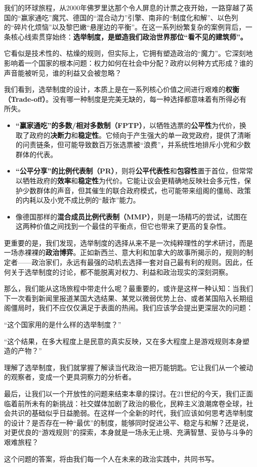 我们的环球旅程，从2000年佛罗里达那个令人屏息的计票之夜开始，一路穿越了英国的“赢家通吃”魔咒、德国的“混合动力”引擎、南非的“制度化和解”、以色列的“碎片化烦恼”以及黎巴嫩“悬崖边的平衡”。在这一系列纷繁复杂的案例背后，一条核心线索贯穿始终：\textbf{选举制度，是塑造我们政治世界那位“看不见的建筑师”。}

它看似是技术性的、枯燥的规则，但实际上，它拥有塑造政治的“魔力”。它深刻地影响着一个国家的根本问题：权力如何在社会中分配？政府以何种方式形成？谁的声音能被听见，谁的利益又会被忽略？

我们看到，选举制度的设计，本质上是在一系列核心价值之间进行艰难的\textbf{权衡（Trade-off）}。没有哪一种制度是完美无缺的，每一种选择都意味着有所得必有所失。

\begin{itemize}
    \item \textbf{“赢家通吃”的多数/相对多数制（FPTP）}，以牺牲选票的\textbf{公平性}为代价，换取了政府的\textbf{决断力}和\textbf{稳定性}。它倾向于产生强大的单一政党政府，提供了清晰的问责链条，但可能导致数百万张选票被“浪费”，并系统性地排斥小党和少数群体的代表。
    \item \textbf{“公平分享”的比例代表制（PR）}，则将\textbf{公平代表性}和\textbf{包容性}置于首位，但常常以牺牲政府的\textbf{效率}和\textbf{稳定性}为代价。它能让议会更精确地反映社会多元性，保护少数群体的声音，但其催生的联合政府模式，也可能带来组阁的僵局、政策的内耗以及小党不成比例的“敲诈”能力。
    \item 像德国那样的\textbf{混合成员比例代表制（MMP）}，则是一场精巧的尝试，试图在这两种价值之间找到一个最佳的平衡点，但它也带来了更高的复杂性。
\end{itemize}

更重要的是，我们发现，选举制度的选择从来不是一次纯粹理性的学术研讨，而是一场赤裸裸的\textbf{政治博弈}。正如新西兰、意大利和加拿大的故事所揭示的，规则的制定者——政治家们，永远有最强的动机去选择一套对自己最有利的规则。因此，任何关于选举制度的讨论，都不能脱离对权力、利益和政治现实的深刻洞察。

那么，我们能从这场旅程中带走什么呢？最重要的，或许是这样一种认知：当我们下一次看到新闻里报道某国大选结果、某党以微弱优势上台、或者某国陷入长期组阁僵局时，我们不应仅仅满足于表面的热闹。我们应该学会提出更深层次的问题：

“这个国家用的是什么样的选举制度？”

“这个结果，在多大程度上是民意的真实反映，又在多大程度上是游戏规则本身塑造的产物？”

理解了选举制度，我们就掌握了解读当代政治一把万能钥匙。它让我们从一个被动的观察者，变成一个更具洞察力的分析者。

最后，让我们以一个开放性的问题来结束本章的探讨。在21世纪的今天，我们正面临着前所未有的新挑战：社交媒体加剧了政治的极化，民粹主义浪潮席卷全球，社会共识的基础似乎日益脆弱。在这样一个全新的时代，我们应该如何思考选举制度的设计？是否存在一种“最优”的制度，能够同时促进公平、稳定与和解？还是说，对更优良的“游戏规则”的探索，本身就是一场永无止境、充满智慧、妥协与斗争的艰难旅程？

这个问题的答案，将由我们每一个人在未来的政治实践中，共同书写。